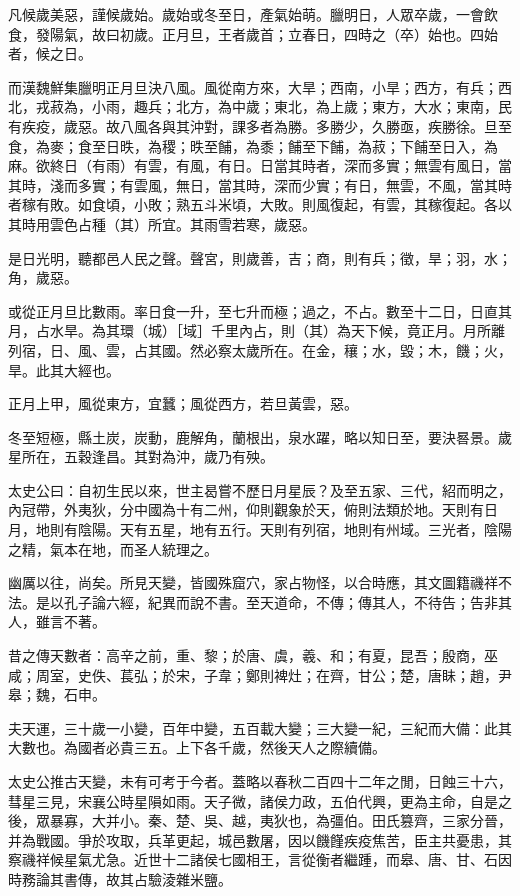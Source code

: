 \documentclass[10pt,fontset=adobe,UTF8,twoside]{ctexrep}
\begin{document}
凡候歲美惡，謹候歲始。歲始或冬至日，產氣始萌。臘明日，人眾卒歲，一會飲食，發陽氣，故曰初歲。正月旦，王者歲首；立春日，四時之（卒）始也。四始者，候之日。

而漢魏鮮集臘明正月旦決八風。風從南方來，大旱；西南，小旱；西方，有兵；西北，戎菽為，小雨，趣兵；北方，為中歲；東北，為上歲；東方，大水；東南，民有疾疫，歲惡。故八風各與其沖對，課多者為勝。多勝少，久勝亟，疾勝徐。旦至食，為麥；食至日昳，為稷；昳至餔，為黍；餔至下餔，為菽；下餔至日入，為麻。欲終日（有雨）有雲，有風，有日。日當其時者，深而多實；無雲有風日，當其時，淺而多實；有雲風，無日，當其時，深而少實；有日，無雲，不風，當其時者稼有敗。如食頃，小敗；熟五斗米頃，大敗。則風復起，有雲，其稼復起。各以其時用雲色占種（其）所宜。其雨雪若寒，歲惡。

是日光明，聽都邑人民之聲。聲宮，則歲善，吉；商，則有兵；徵，旱；羽，水；角，歲惡。

或從正月旦比數雨。率日食一升，至七升而極；過之，不占。數至十二日，日直其月，占水旱。為其環（城）［域］千里內占，則（其）為天下候，竟正月。月所離列宿，日、風、雲，占其國。然必察太歲所在。在金，穰；水，毀；木，饑；火，旱。此其大經也。

正月上甲，風從東方，宜蠶；風從西方，若旦黃雲，惡。

冬至短極，縣土炭，炭動，鹿解角，蘭根出，泉水躍，略以知日至，要決晷景。歲星所在，五穀逢昌。其對為沖，歲乃有殃。

太史公曰：自初生民以來，世主曷嘗不歷日月星辰？及至五家、三代，紹而明之，內冠帶，外夷狄，分中國為十有二州，仰則觀象於天，俯則法類於地。天則有日月，地則有陰陽。天有五星，地有五行。天則有列宿，地則有州域。三光者，陰陽之精，氣本在地，而圣人統理之。

幽厲以往，尚矣。所見天變，皆國殊窟穴，家占物怪，以合時應，其文圖籍禨祥不法。是以孔子論六經，紀異而說不書。至天道命，不傳；傳其人，不待告；告非其人，雖言不著。

昔之傳天數者：高辛之前，重、黎；於唐、虞，羲、和；有夏，昆吾；殷商，巫咸；周室，史佚、萇弘；於宋，子韋；鄭則裨灶；在齊，甘公；楚，唐眛；趙，尹皋；魏，石申。

夫天運，三十歲一小變，百年中變，五百載大變；三大變一紀，三紀而大備：此其大數也。為國者必貴三五。上下各千歲，然後天人之際續備。

太史公推古天變，未有可考于今者。蓋略以春秋二百四十二年之閒，日蝕三十六，彗星三見，宋襄公時星隕如雨。天子微，諸侯力政，五伯代興，更為主命，自是之後，眾暴寡，大并小。秦、楚、吳、越，夷狄也，為彊伯。田氏篡齊，三家分晉，并為戰國。爭於攻取，兵革更起，城邑數屠，因以饑饉疾疫焦苦，臣主共憂患，其察禨祥候星氣尤急。近世十二諸侯七國相王，言從衡者繼踵，而皋、唐、甘、石因時務論其書傳，故其占驗淩雜米鹽。
\end{document}
